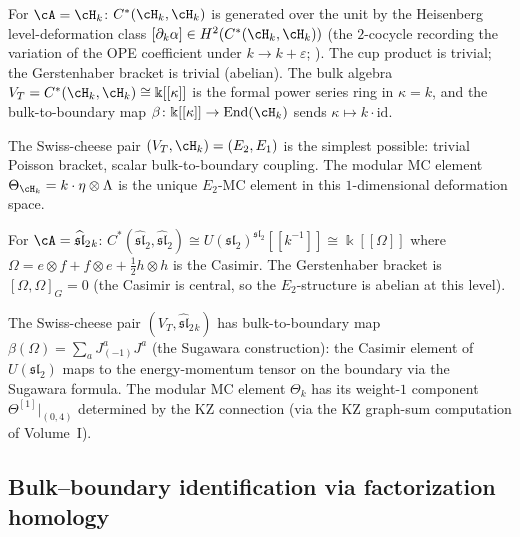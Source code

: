 \begin{computation}
\label{comp:tamarkin-e2-heisenberg}
For $\cA=\cH_k$: $C^*(\cH_k,\cH_k)$ is generated over the
unit by the Heisenberg level-deformation class
$[\partial_k\alpha]\in H^2(C^*(\cH_k,\cH_k))$ (the
$2$-cocycle recording the variation of the OPE coefficient
under $k\to k+\varepsilon$; ). The
cup product is trivial; the Gerstenhaber
bracket is trivial (abelian). The bulk algebra
$V_T=C^*(\cH_k,\cH_k)\cong\Bbbk[[\kappa]]$ is the formal
power series ring in $\kappa=k$, and the bulk-to-boundary
map $\beta\colon\Bbbk[[\kappa]]\to\operatorname{End}(\cH_k)$
sends $\kappa\mapsto k\cdot\mathrm{id}$.

The Swiss-cheese pair $(V_T,\cH_k)=(E_2,E_1)$ is the
simplest possible: trivial Poisson bracket, scalar
bulk-to-boundary coupling. The modular MC element
$\Theta_{\cH_k}=k\cdot\eta\otimes\Lambda$ is the unique
$E_2$-MC element in this $1$-dimensional deformation space.
\end{computation}

\begin{computation}
\label{comp:tamarkin-e2-sl2}
For $\cA=\widehat{\mathfrak{sl}}_2{}_k$:
$C^*(\widehat{\mathfrak{sl}}_2,\widehat{\mathfrak{sl}}_2)
\cong U(\mathfrak{sl}_2)^{\mathfrak{sl}_2}[\![k^{-1}]\!]
\cong\Bbbk[[\Omega]]$
where $\Omega=e\otimes f+f\otimes e+\tfrac12 h\otimes h$
is the Casimir. The Gerstenhaber bracket is
$[\Omega,\Omega]_G=0$ (the Casimir is central, so the
$E_2$-structure is abelian at this level).

The Swiss-cheese pair
$(V_T,\widehat{\mathfrak{sl}}_2{}_k)$ has
bulk-to-boundary map
$\beta(\Omega)=\sum_a J^a_{(-1)}J^a$
(the Sugawara construction): the Casimir element of
$U(\mathfrak{sl}_2)$ maps to the energy-momentum tensor
on the boundary via the Sugawara formula. The modular MC
element $\Theta_k$ has its weight-$1$ component
$\Theta^{[1]}|_{(0,4)}$ determined by the KZ connection
(via the KZ graph-sum computation of Volume~I).
\end{computation}

\subsection{Bulk--boundary identification via factorization homology}

